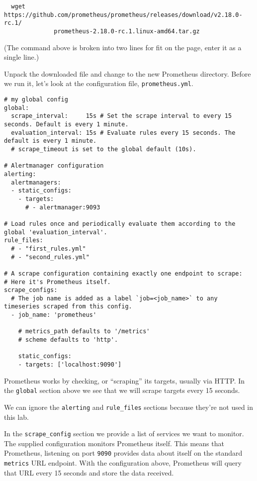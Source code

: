 \documentclass{article}   	%
\begin{document}
\begin{verbatim}
  wget https://github.com/prometheus/prometheus/releases/download/v2.18.0-rc.1/
              prometheus-2.18.0-rc.1.linux-amd64.tar.gz
\end{verbatim}  

(The command above is broken into two lines for fit on the page, enter it as a single line.)

Unpack the downloaded file and change to the new Prometheus directory. Before we run it, let's look at the configuration file, \texttt{prometheus.yml}.

\begin{verbatim}
# my global config
global:
  scrape_interval:     15s # Set the scrape interval to every 15 seconds. Default is every 1 minute.
  evaluation_interval: 15s # Evaluate rules every 15 seconds. The default is every 1 minute.
  # scrape_timeout is set to the global default (10s).

# Alertmanager configuration
alerting:
  alertmanagers:
  - static_configs:
    - targets:
      # - alertmanager:9093

# Load rules once and periodically evaluate them according to the global 'evaluation_interval'.
rule_files:
  # - "first_rules.yml"
  # - "second_rules.yml"

# A scrape configuration containing exactly one endpoint to scrape:
# Here it's Prometheus itself.
scrape_configs:
  # The job name is added as a label `job=<job_name>` to any timeseries scraped from this config.
  - job_name: 'prometheus'

    # metrics_path defaults to '/metrics'
    # scheme defaults to 'http'.

    static_configs:
    - targets: ['localhost:9090']
\end{verbatim}

Prometheus works by checking, or ``scraping'' its targets, usually via HTTP. In the \texttt{global} section above we see that we will scrape targets every 15 seconds.

We can ignore the \texttt{alerting} and \texttt{rule\_files} sections because they're not used in this lab.

In the \texttt{scrape\_config} section we provide a list of services we want to monitor. The supplied configuration monitors Prometheus itself. This means that Prometheus, listening on port \texttt{9090} provides data about itself on the standard \texttt{metrics} URL endpoint. With the configuration above, Prometheus will query that URL every 15 seconds and store the data received.
\end{document}
